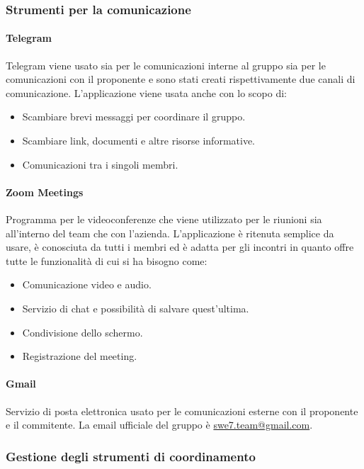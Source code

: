 \subsubsection{Strumenti per la comunicazione}
\paragraph{Telegram}
Telegram viene usato sia per le comunicazioni interne al gruppo sia per le comunicazioni con il proponente e
sono stati creati rispettivamente due canali di comunicazione. L'applicazione viene usata anche con lo scopo di:
\begin{itemize}
    \item Scambiare brevi messaggi per coordinare il gruppo.
    \item Scambiare link, documenti e altre risorse informative.
    \item Comunicazioni tra i singoli membri.
\end{itemize}

\paragraph{Zoom Meetings}
Programma per le videoconferenze che viene utilizzato per le riunioni sia all'interno del team che con l'azienda. L'applicazione è ritenuta semplice da usare,
è conosciuta da tutti i membri ed è adatta per gli incontri in quanto offre tutte le funzionalità di cui si ha bisogno come:
\begin{itemize}
    \item Comunicazione video e audio.
    \item Servizio di chat e possibilità di salvare quest'ultima.
    \item Condivisione dello schermo.
    \item Registrazione del meeting.
\end{itemize}

\paragraph{Gmail}
Servizio di posta elettronica usato per le comunicazioni esterne con il proponente e il commitente. La email ufficiale
del gruppo è \href{mailto:swe7.team@gmail.com}{swe7.team@gmail.com}.

\subsubsection{Gestione degli strumenti di coordinamento}
